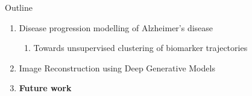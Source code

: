\documentclass[8pt,xcolor=table,aspectratio=169]{beamer}
\begin{document}
\begin{frame}{Outline}

\begin{enumerate}
 \item Disease progression modelling of Alzheimer's disease
 \begin{enumerate} 
  \item Towards unsupervised clustering of biomarker trajectories\\
 \end{enumerate}
   
 
  
  \vt

 \item Image Reconstruction using Deep Generative Models\\
\brgmoursshort
\vt
 
  \item \textbf{Future work}\\

\end{enumerate}
\end{frame}
\end{document}
